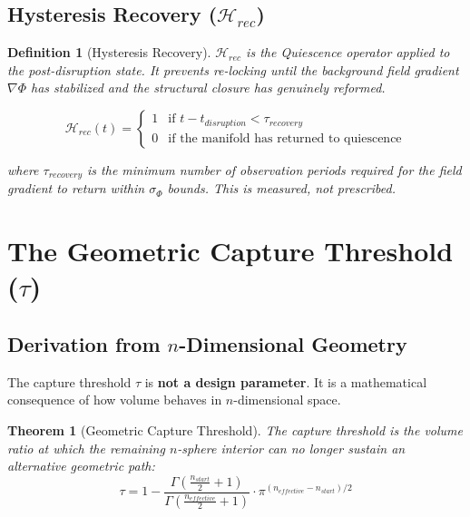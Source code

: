 \documentclass[11pt, a4paper]{article}
\newtheorem{definition}{Definition}[section]
\newtheorem{theorem}{Theorem}[section]
\begin{document}
\subsection{Hysteresis Recovery ($\mathcal{H}_{rec}$)}

\begin{definition}[Hysteresis Recovery]
$\mathcal{H}_{rec}$ is the Quiescence operator applied to the
post-disruption state. It prevents re-locking until the background field
gradient $\nabla \Phi$ has stabilized and the structural closure has
genuinely reformed.

\begin{equation}
  \mathcal{H}_{rec}(t) = \begin{cases}
    1 & \text{if } t - t_{disruption} < \tau_{recovery} \\
    0 & \text{if the manifold has returned to quiescence}
  \end{cases}
\end{equation}

where $\tau_{recovery}$ is the minimum number of observation periods
required for the field gradient to return within $\sigma_{\Phi}$ bounds.
This is measured, not prescribed.
\end{definition}

\section{The Geometric Capture Threshold ($\tau$)}

\subsection{Derivation from $n$-Dimensional Geometry}

The capture threshold $\tau$ is \textbf{not a design parameter}. It is a
mathematical consequence of how volume behaves in $n$-dimensional space.

\begin{theorem}[Geometric Capture Threshold]
The capture threshold is the volume ratio at which the remaining
$n$-sphere interior can no longer sustain an alternative geometric path:
\begin{equation}
  \boxed{
    \tau = 1 - \frac{\Gamma\!\left(\frac{n_{start}}{2} + 1\right)}
                    {\Gamma\!\left(\frac{n_{effective}}{2} + 1\right)}
    \cdot \pi^{(n_{effective} - n_{start})/2}
  }
  \label{eq:tau}
\end{equation}
\end{theorem}
\end{document}
